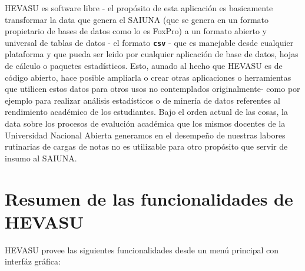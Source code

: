 \documentclass[letterpaper,12pt]{book}
\newcommand{\fileformat}[1]{\textbf{\texttt{#1}}}
\begin{document}
HEVASU es software libre - el propósito de esta aplicación es basicamente transformar la data que genera el SAIUNA (que se genera en un formato propietario de bases de datos como lo es FoxPro) a un formato abierto y universal de tablas de datos - el formato \fileformat{csv} - que es manejable desde cualquier plataforma y que pueda ser leido por cualquier aplicación de base de datos, hojas de cálculo o paquetes estadísticos.  Esto, aunado al hecho que HEVASU es de código abierto, hace posible ampliarla o crear otras aplicaciones o herramientas que utilicen estos datos para otros usos no contemplados originalmente- como por ejemplo para realizar análisis estadísticos o de minería de datos referentes al rendimiento académico de los estudiantes.  Bajo el orden actual de las cosas, la data sobre los procesos de evalución académica que los mismos docentes de la Universidad Nacional Abierta generamos en el desempeño de nuestras labores rutinarias de cargas de notas no es utilizable para otro propósito que servir de insumo al SAIUNA.

\section{Resumen de las funcionalidades de HEVASU}

HEVASU provee las siguientes funcionalidades desde un menú principal con interfáz gráfica:
\end{document}
